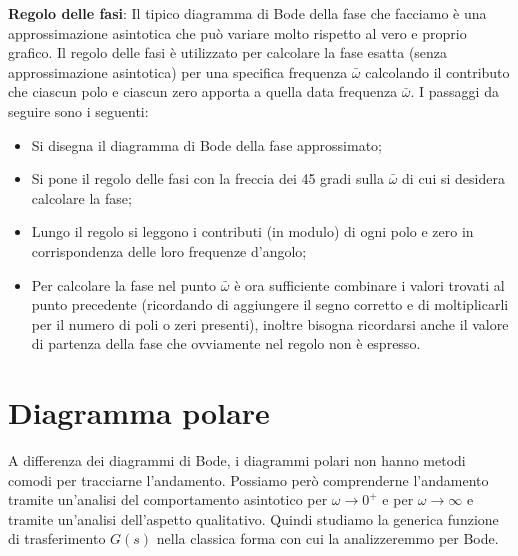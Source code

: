     \textbf{Regolo delle fasi}:\newline
    Il tipico diagramma di Bode della fase che facciamo è una approssimazione asintotica che può variare molto rispetto al vero e proprio grafico. Il regolo delle fasi è utilizzato per calcolare la fase esatta (senza approssimazione asintotica) per una specifica frequenza $\bar{\omega}$ calcolando il contributo che ciascun polo e ciascun zero apporta a quella data frequenza $\bar{\omega}$.\newline
    I passaggi da seguire sono i seguenti:
    \begin{itemize}
        \item Si disegna il diagramma di Bode della fase approssimato;
        \item Si pone il regolo delle fasi con la freccia dei 45 gradi sulla $\bar{\omega}$ di cui si desidera calcolare la fase;
        \item Lungo il regolo si leggono i contributi (in modulo) di ogni polo e zero in corrispondenza delle loro frequenze d'angolo;
        \item Per calcolare la fase nel punto $\bar{\omega}$ è ora sufficiente combinare i valori trovati al punto precedente (ricordando di aggiungere il segno corretto e  di moltiplicarli per il numero di poli o zeri presenti), inoltre bisogna ricordarsi anche il valore di partenza della fase che ovviamente nel regolo non è espresso.
    \end{itemize}
    \newpage\section{Diagramma polare}
    A differenza dei diagrammi di Bode, i diagrammi polari non hanno metodi comodi per tracciarne l'andamento. Possiamo però comprenderne l'andamento tramite un'analisi del comportamento asintotico per $\omega \rightarrow 0^+$ e per $\omega \rightarrow  \infty$ e tramite un'analisi dell'aspetto qualitativo.\newline
    \newline
    Quindi studiamo la generica funzione di trasferimento $G(s)$ nella classica forma con cui la analizzeremmo per Bode.
